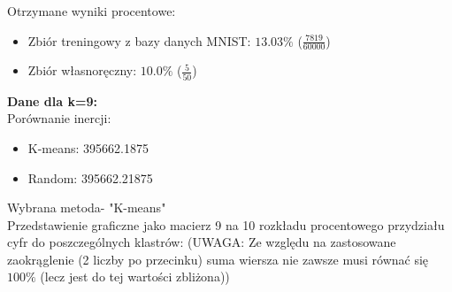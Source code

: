 \documentclass[a4paper,14pt]{report}
\begin{document}
	Otrzymane wyniki procentowe:
	\begin{itemize}
		\item Zbiór treningowy z bazy danych MNIST: $13.03\%$ ($\frac{7819}{60000}$)
		\item Zbiór własnoręczny: $10.0\%$ ($\frac{5}{50}$)
	\end{itemize}
	\textbf{Dane dla k=9: } \\
	Porównanie inercji: 
	\begin{itemize}
		\item K-means: 395662.1875
		\item Random: 395662.21875
	\end{itemize}
	Wybrana metoda- "K-means" \\
	Przedstawienie graficzne jako macierz 9 na 10 rozkładu procentowego przydziału cyfr do poszczególnych klastrów:
	(UWAGA: Ze względu na zastosowane zaokrąglenie (2 liczby po przecinku) suma wiersza nie zawsze musi równać się $100\%$ (lecz jest do tej wartości zbliżona))
\end{document}
